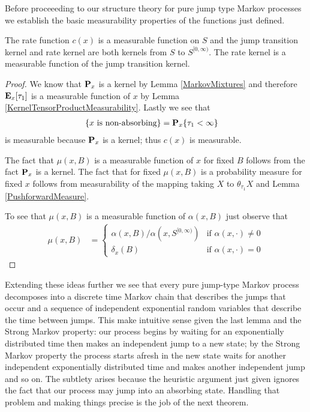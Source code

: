 Before proceeeding to our structure theory for pure jump type Markov
processes we establish the basic measurability properties of the
functions just defined.
\begin{lem}The rate function $c(x)$ is a measurable function on $S$
  and the jump transition kernel and rate kernel are both kernels from
  $S$ to $S^{[0,\infty)}$.  The rate kernel is a measurable function
  of the jump transition kernel.
\end{lem}
\begin{proof}
We know that $\probabilityop_x$ is a kernel by Lemma
\ref{MarkovMixtures} and therefore $\sexpectation{\tau_1}{x}$ is a
measurable function of $x$ by Lemma
\ref{KernelTensorProductMeasurability}.  Lastly we see that 
\begin{align*}
\lbrace x \text{ is non-absorbing} \rbrace &= \sprobability{\tau_1 <
  \infty}{x}
\end{align*}
is measurable because $\probabilityop_x$ is a kernel; thus $c(x)$ is measurable.

The fact that $\mu(x,B)$ is a measurable function of $x$ for fixed $B$
follows from the fact $\probabilityop_x$ is a kernel.  The fact that
for fixed $\mu(x,B)$ is a probability measure for fixed $x$ follows
from measurability of the mapping taking $X$ to $\theta_{\tau_1}X$ and
Lemma \ref{PushforwardMeasure}.

To see that $\mu(x,B)$ is a measurable function of $\alpha(x,B)$ just
observe that 
\begin{align*}
\mu(x,B) &= \begin{cases}
\alpha(x,B)/\alpha(x, S^{[0,\infty)}) & \text{if $\alpha(x, \cdot)
  \neq 0$} \\
\delta_x(B) & \text{if $\alpha(x, \cdot) = 0$}
\end{cases}
\end{align*}
\end{proof}

Extending these ideas further we see that every pure jump-type Markov
process decomposes into a discrete time Markov chain that describes
the jumps that occur and a sequence of independent exponential random
variables that describe the time between jumps.   This make intuitive sense given the
last lemma and the Strong Markov property: our process begins by
waiting for an exponentially distributed time then makes an
independent jump to a new state; by the Strong Markov property the
process starts afresh in the new state waits for another independent
exponentially distributed time and makes another independent jump and
so on.  The subtlety arises because the heuristic argument just given
ignores the fact that our process may jump into an absorbing state.
Handling that problem and making things precise is the job of the
next theorem.

